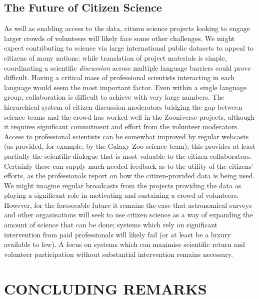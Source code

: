 \documentclass{ar2e}
\begin{document}
 


\subsection{The Future of Citizen Science}

As well as enabling access to the data, citizen science projects looking to
engage larger crowds of volunteers will likely face some other  challenges. We
might expect contributing to science via large international public datasets to
appeal to citizens of many nations: while translation of project materials is simple, 
coordinating a scientific \emph{discussion} across multiple language barriers could prove difficult. Having a critical mass of
professional scientists interacting in each language would seem the most
important factor. Even within a single language group, collaboration is
difficult to achieve with  very large numbers. The hierarchical system of
citizen discussion  moderators bridging the gap between science teams and the
crowd has worked well in the Zooniverse projects, although it requires
significant commitment and effort from the volunteer moderators. Access to
professional scientists can be somewhat improved by regular webcasts (as
provided, for example, by the Galaxy Zoo science team); this provides at least
partially the scientific dialogue that is most valuable to the citizen
collaborators. Certainly these can supply much-needed feedback as to the utility
of the citizens' efforts, as the professionals report on how the
citizen-provided data is being used. We might imagine regular broadcasts from
the projects providing the data as playing a significant role in motivating and
sustaining a crowd of volunteers. However, for the foreseeable future it remains the case
that astronomical surveys and other organisations will seek to use citizen science as a 
way of expanding the amount of science that can be done; systems which rely on significant
intervention from paid professionals will likely fail (or at least be a luxury available to few). A
focus on systems which can maximise scientific return and volunteer participation without
substantial intervention remains necessary. 


\section{CONCLUDING REMARKS}
\label{sec:conclusions}
\end{document}
